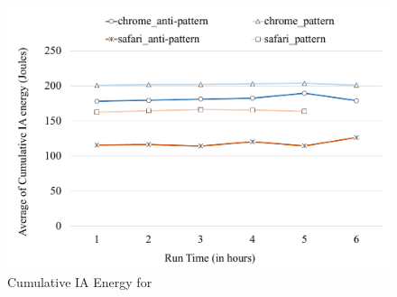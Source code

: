 \begin{figure}[ht]
	\includegraphics[width=\linewidth]{RQ3/Img/rq3-lazyload-cumulative-IA-eng.pdf}
	\caption{Cumulative IA Energy for \oown}
	\label{fig:rq3-lazyload-cumulative-IA-eng}	
\end{figure}